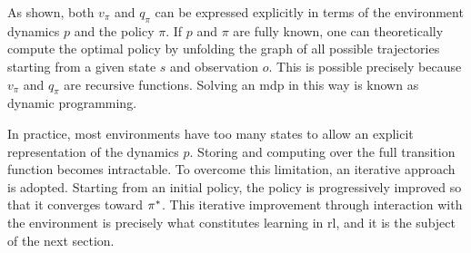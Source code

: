As shown, both \(v_\pi\) and \(q_\pi\) can be expressed explicitly in terms of the environment dynamics \(p\) and the policy \(\pi\).
If \(p\) and \(\pi\) are fully known, one can theoretically compute the optimal policy by unfolding the graph of all possible trajectories starting from a given state \(s\) and observation \(o\).
This is possible precisely because \(v_\pi\) and \(q_\pi\) are recursive functions.
Solving an \gls{mdp} in this way is known as dynamic programming.

In practice, most environments have too many states to allow an explicit representation of the dynamics \(p\).  
Storing and computing over the full transition function becomes intractable.
To overcome this limitation, an iterative approach is adopted.
Starting from an initial policy, the policy is progressively improved so that it converges toward \(\pi^{*}\).
This iterative improvement through interaction with the environment is precisely what constitutes learning in \gls{rl}, and it is the subject of the next section.